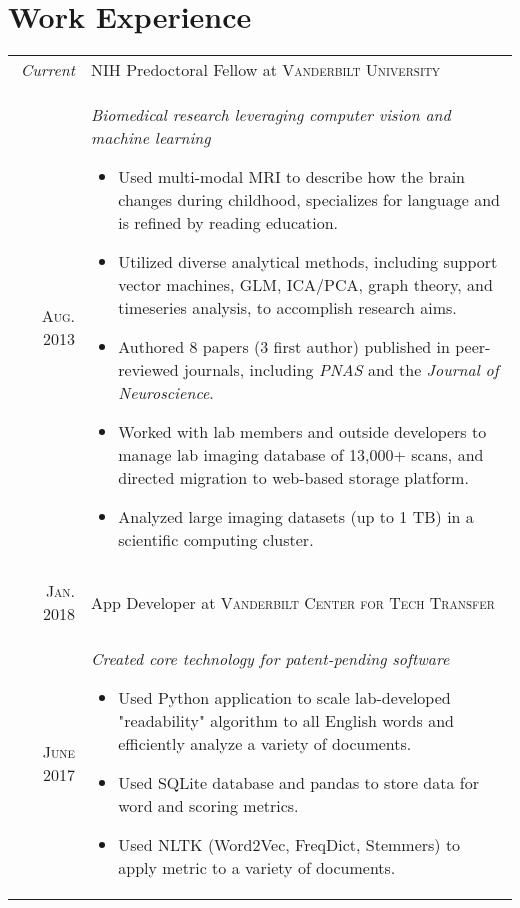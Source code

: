 \documentclass[a4paper,10pt]{article}
\begin{document}
\section{Work Experience}
\begin{longtable}{r|p{11cm}}
 	\emph{Current} & NIH Predoctoral Fellow at \textsc{Vanderbilt University} \\
 	\textsc{Aug. 2013} & \emph{Biomedical research leveraging computer vision and machine learning} \footnotesize{
 	\begin{itemize}[itemsep=1pt,topsep=2pt]
    	\item Used multi-modal MRI to describe how the brain changes during childhood, specializes for language and is refined by reading education. 
    	\item Utilized diverse analytical methods, including support vector machines, GLM, ICA/PCA, graph theory, and timeseries analysis, to accomplish research aims. 
        \item Authored 8 papers (3 first author) published in peer-reviewed journals,  including  \textit{PNAS} and the  \textit{Journal of Neuroscience}. 
        \item Worked with lab members and outside developers to manage lab imaging database of 13,000+ scans, and directed migration to web-based storage platform.
        \item Analyzed large imaging datasets (up to 1 TB) in a scientific computing cluster.
	\end{itemize} } \\
	\multicolumn{2}{c}{}\\
    
	\textsc{Jan.} 2018 & App Developer at \textsc{Vanderbilt Center for Tech Transfer} \\
	\textsc{June} 2017&\emph{Created core technology for patent-pending software}
	\footnotesize{
	\begin{itemize}[itemsep=1pt,topsep=2pt]
	    \item Used Python application to scale lab-developed "readability" algorithm to all English words and efficiently analyze a variety of documents. 
	    
	    \item Used SQLite database and pandas to store data for word and scoring metrics.
	    
	    \item Used NLTK (Word2Vec, FreqDict, Stemmers) to apply metric to a variety of documents.
	    

\end{itemize}}
\end{longtable}
\end{document}

